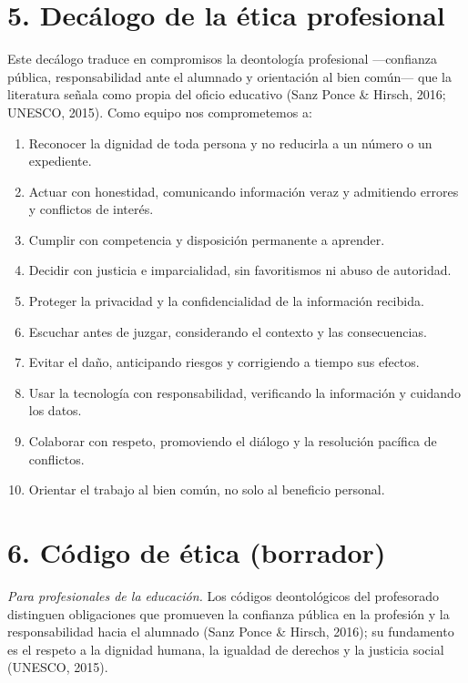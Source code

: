 \documentclass[12pt]{article}
\newcommand{\cita}[1]{\textup{(#1)}}
\begin{document}
\section*{5. Decálogo de la ética profesional}

Este decálogo traduce en compromisos la deontología profesional ---confianza pública,
responsabilidad ante el alumnado y orientación al bien común--- que la literatura señala
como propia del oficio educativo \cita{Sanz Ponce \& Hirsch, 2016; UNESCO, 2015}. Como
equipo nos comprometemos a:

\begin{enumerate}[leftmargin=1.6em,itemsep=1pt,topsep=2pt]
  \item Reconocer la dignidad de toda persona y no reducirla a un número o un expediente.
  \item Actuar con honestidad, comunicando información veraz y admitiendo errores y
        conflictos de interés.
  \item Cumplir con competencia y disposición permanente a aprender.
  \item Decidir con justicia e imparcialidad, sin favoritismos ni abuso de autoridad.
  \item Proteger la privacidad y la confidencialidad de la información recibida.
  \item Escuchar antes de juzgar, considerando el contexto y las consecuencias.
  \item Evitar el daño, anticipando riesgos y corrigiendo a tiempo sus efectos.
  \item Usar la tecnología con responsabilidad, verificando la información y cuidando los
        datos.
  \item Colaborar con respeto, promoviendo el diálogo y la resolución pacífica de
        conflictos.
  \item Orientar el trabajo al bien común, no solo al beneficio personal.
\end{enumerate}

\section*{6. Código de ética (borrador)}

\textit{Para profesionales de la educación.} Los códigos deontológicos del profesorado
distinguen obligaciones que promueven la confianza pública en la profesión y la
responsabilidad hacia el alumnado \cita{Sanz Ponce \& Hirsch, 2016}; su fundamento es el
respeto a la dignidad humana, la igualdad de derechos y la justicia social
\cita{UNESCO, 2015}.
\end{document}
